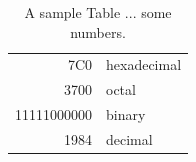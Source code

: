 \begin{table}[tbh]
\caption{A sample Table ... some numbers. \label{somenumbers}}
\begin{center}
\begin{tabular}{|r|l|}
  \hline
  7C0 & hexadecimal \\
  3700 & octal \\ \cline{2-2}
  11111000000 & binary \\
  \hline \hline
  1984 & decimal \\
  \hline
\end{tabular}
\end{center}
\end{table}

